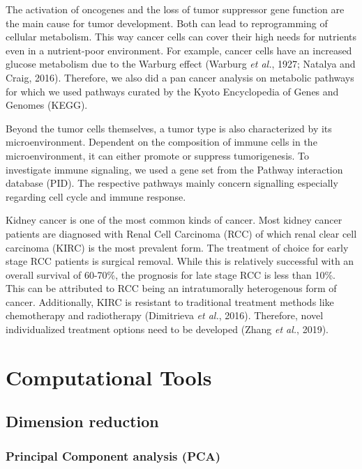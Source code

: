\documentclass[
  parskip,
  oneside]{scrreprt}
\begin{document}
The activation of oncogenes and the loss of tumor suppressor gene
function are the main cause for tumor development. Both can lead to
reprogramming of cellular metabolism. This way cancer cells can cover
their high needs for nutrients even in a nutrient-poor environment. For
example, cancer cells have an increased glucose metabolism due to the
Warburg effect (Warburg \emph{et al.}, 1927; Natalya and Craig, 2016).
Therefore, we also did a pan cancer analysis on metabolic pathways for
which we used pathways curated by the Kyoto Encyclopedia of Genes and
Genomes (KEGG).

Beyond the tumor cells themselves, a tumor type is also characterized by
its microenvironment. Dependent on the composition of immune cells in
the microenvironment, it can either promote or suppress tumorigenesis.
To investigate immune signaling, we used a gene set from the Pathway
interaction database (PID). The respective pathways mainly concern
signalling especially regarding cell cycle and immune response.

Kidney cancer is one of the most common kinds of cancer. Most kidney
cancer patients are diagnosed with Renal Cell Carcinoma (RCC) of which
renal clear cell carcinoma (KIRC) is the most prevalent form. The
treatment of choice for early stage RCC patients is surgical removal.
While this is relatively successful with an overall survival of 60-70\%,
the prognosis for late stage RCC is less than 10\%. This can be
attributed to RCC being an intratumorally heterogenous form of cancer.
Additionally, KIRC is resistant to traditional treatment methods like
chemotherapy and radiotherapy (Dimitrieva \emph{et al.}, 2016).
Therefore, novel individualized treatment options need to be developed
(Zhang \emph{et al.}, 2019).

\hypertarget{computational-tools}{%
\section{Computational Tools}\label{computational-tools}}

\hypertarget{dimension-reduction}{%
\subsection{Dimension reduction}\label{dimension-reduction}}

\hypertarget{principal-component-analysis-pca}{%
\subsubsection{Principal Component analysis
(PCA)}\label{principal-component-analysis-pca}}
\end{document}
